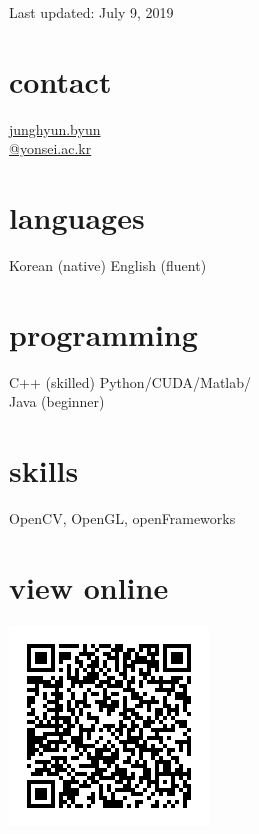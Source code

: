 \documentclass[]{friggeri-cv}
\begin{document}
       {Last updated: July 9, 2019}

\begin{aside}
  \section{contact}
    \href{mailto:junghyun.byun@yonsei.ac.kr}{junghyun.byun\\@yonsei.ac.kr}
  \section{languages}
    Korean (native)
    English (fluent)
  \section{programming}
    C++ (skilled)
    Python/CUDA/Matlab/\\Java (beginner)
  \section{skills}
    OpenCV, OpenGL, openFrameworks
  \section{view online}
    \includegraphics[width=\textwidth]{data/cv_qr_code}
\end{aside}
\end{document}
